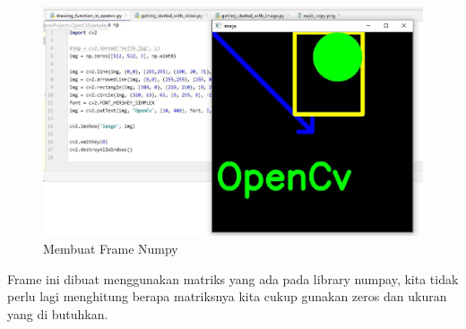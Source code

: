 \begin{figure}[ht]
\centering
\includegraphics[scale=0.5]{figures/2,15.jpg}
\caption{Membuat Frame Numpy}
\label{contoh}
\end{figure}

Frame ini dibuat menggunakan matriks yang ada pada library numpay, kita tidak perlu lagi menghitung berapa matriksnya kita cukup gunakan zeros dan ukuran yang di butuhkan.